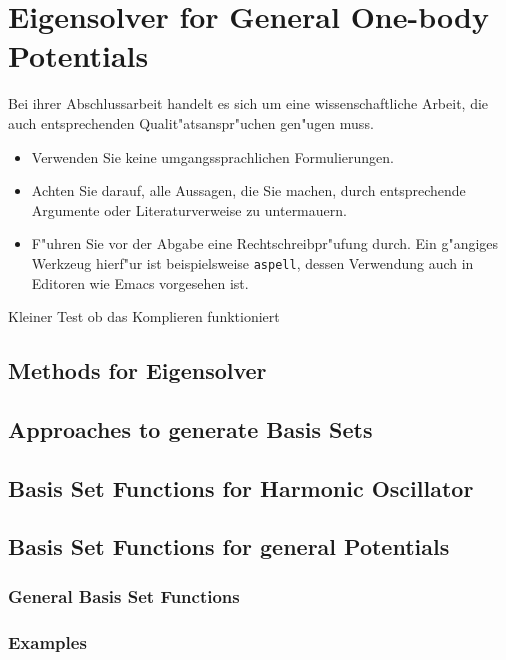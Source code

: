 \chapter{Eigensolver for General One-body Potentials}
\label{c:inhalt}



Bei ihrer Abschlussarbeit handelt es sich um eine
  wissenschaftliche Arbeit, die auch entsprechenden
  Qualit"atsanspr"uchen gen"ugen muss.
  \begin{itemize}
  \item Verwenden Sie keine umgangssprachlichen Formulierungen.
  \item Achten Sie darauf, alle Aussagen, die Sie machen, durch
    entsprechende Argumente oder Literaturverweise zu untermauern.
  \item F"uhren Sie vor der Abgabe eine Rechtschreibpr"ufung durch.
    Ein g"angiges Werkzeug hierf"ur ist beispielsweise
    \texttt{aspell}, dessen Verwendung auch in Editoren wie Emacs
    vorgesehen ist.
  \end{itemize}


Kleiner Test ob das Komplieren funktioniert
\section{Methods for Eigensolver}
\section{Approaches to generate Basis Sets}

\section{Basis Set Functions for Harmonic Oscillator}
\section{Basis Set Functions for general Potentials}
\subsection{General Basis Set Functions}
\subsection{Examples}